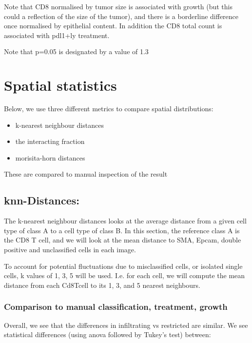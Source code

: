 \documentclass[
]{book}
\providecommand{\tightlist}{%
  \setlength{\itemsep}{0pt}\setlength{\parskip}{0pt}}
\begin{document}
Note that CD8 normalised by tumor size is associated with growth (but this could a reflection of the size of the tumor), and there is a borderline difference once normalised by epithelial content. In addition the CD8 total count is associated with pdl1+ly treatment.

Note that p=0.05 is designated by a value of 1.3

\hypertarget{spatial-statistics}{%
\chapter{Spatial statistics}\label{spatial-statistics}}

Below, we use three different metrics to compare spatial distributions:

\begin{itemize}
\tightlist
\item
  k-nearest neighbour distances
\item
  the interacting fraction
\item
  morisita-horn distances
\end{itemize}

These are compared to manual inspection of the result

\hypertarget{knn-distances}{%
\section{knn-Distances:}\label{knn-distances}}

The k-nearest neighbour distances looks at the average distance from a given cell type of class A to a cell type of class B. In this section, the reference class A is the CD8 T cell, and we will look at the mean distance to SMA, Epcam, double positive and unclassified cells in each image.

To account for potential fluctuations due to misclassified cells, or isolated single cells, k values of 1, 3, 5 will be used. I.e. for each cell, we will compute the mean distance from each Cd8Tcell to its 1, 3, and 5 nearest neighbours.

\hypertarget{comparison-to-manual-classification-treatment-growth}{%
\subsection{Comparison to manual classification, treatment, growth}\label{comparison-to-manual-classification-treatment-growth}}

Overall, we see that the differences in infiltrating vs restricted are similar. We see statistical differences (using anova followed by Tukey's test) between:
\end{document}

